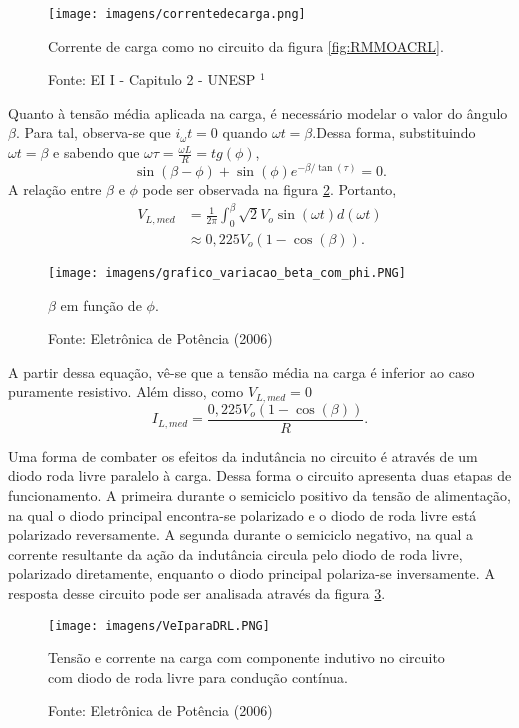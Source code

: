 \begin{figure}[h]
\center
\texttt{[image: imagens/correntedecarga.png]}
\caption{Corrente de carga como no circuito da figura \ref{fig:RMMOACRL}.}\label{RMMOACRLI}
\caption*{Fonte: EI I - Capitulo 2 - UNESP $^1$}
\end{figure}

Quanto à tensão média aplicada na carga, é necessário modelar o valor do ângulo $\beta$. Para tal, observa-se que $i_{\omega}{t} = 0 $ quando ${\omega}{t} = {\beta}$.Dessa forma, substituindo ${\omega}{t} = {\beta}$ e sabendo que ${\omega}{\tau} = {\frac{\omega{L}}{R}} = {tg}{(\phi)}$, \[
\sin({\beta}-{\phi}) + \sin({\phi}){e^{-\beta/{ \tan({\tau})}}} = 0
.\] A relação entre $\beta$ e $\phi$ pode ser observada na figura \ref{fig:ACFA}. Portanto,
\begin{align*}
    V_{L,med} &= {\frac{1}{2\pi}{\int_{0}^{\beta}\sqrt{2}{V_o}{\sin({\omega}{t})}}d({\omega}{t})} \\
&\approx 0,225{V_o(1 - \cos({\beta}))}
.\end{align*}

\newpage
\begin{figure}[ht]
\center
\texttt{[image: imagens/grafico\_variacao\_beta\_com\_phi.PNG]}
\caption{${\beta}$ em função de ${\phi}$.}\label{fig:ACFA}
\caption*{Fonte: Eletrônica de Potência (2006)}
\end{figure}

A partir dessa equação, vê-se que a tensão média na carga é inferior ao caso puramente resistivo. Além disso, como $V_{L,med} = 0 $ \[
I_{L,med} = \frac{0,225{V_o(1 - \cos({\beta}))}}{R}
.\] 

Uma forma de combater os efeitos da indutância no circuito é através de um diodo roda livre paralelo à carga. Dessa forma o circuito apresenta duas etapas de funcionamento. A primeira durante o semiciclo positivo da tensão de alimentação, na qual o diodo principal encontra-se polarizado e o diodo de roda livre está polarizado reversamente. A segunda durante o semiciclo negativo, na qual a corrente resultante da ação da indutância circula pelo diodo de roda livre, polarizado diretamente, enquanto o diodo principal polariza-se inversamente. A resposta desse circuito pode ser analisada através da figura \ref{fig:VIDRL}.

\begin{figure}[ht]
\center
\texttt{[image: imagens/VeIparaDRL.PNG]}
\caption{Tensão e corrente na carga com componente indutivo no circuito com diodo de roda livre para condução contínua.}\label{fig:VIDRL}
\caption*{Fonte: Eletrônica de Potência (2006)}
\end{figure}

